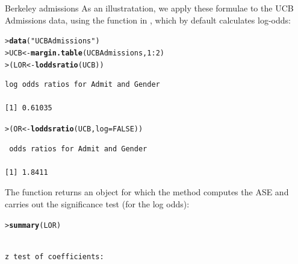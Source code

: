 \documentclass[10pt,krantz2]{krantz}\usepackage[]{graphicx}\usepackage[]{color}
\makeatletter
\newcommand{\hlnum}[1]{\textcolor[rgb]{0.686,0.059,0.569}{#1}}%
\newcommand{\hlstr}[1]{\textcolor[rgb]{0.192,0.494,0.8}{#1}}%
\newcommand{\hlopt}[1]{\textcolor[rgb]{0,0,0}{#1}}%
\newcommand{\hlstd}[1]{\textcolor[rgb]{0.345,0.345,0.345}{#1}}%
\newcommand{\hlkwb}[1]{\textcolor[rgb]{0.69,0.353,0.396}{#1}}%
\newcommand{\hlkwc}[1]{\textcolor[rgb]{0.333,0.667,0.333}{#1}}%
\newcommand{\hlkwd}[1]{\textcolor[rgb]{0.737,0.353,0.396}{\textbf{#1}}}%
\newenvironment{kframe}{%
 \def\at@end@of@kframe{}%
 \ifinner\ifhmode%
  \def\at@end@of@kframe{\end{minipage}}%
  \begin{minipage}{\columnwidth}%
 \fi\fi%
 \def\FrameCommand##1{\hskip\@totalleftmargin \hskip-\fboxsep
 \colorbox{shadecolor}{##1}\hskip-\fboxsep
     \hskip-\linewidth \hskip-\@totalleftmargin \hskip\columnwidth}%
 \MakeFramed {\advance\hsize-\width
   \@totalleftmargin\z@ \linewidth\hsize
   \@setminipage}}%
 {\par\unskip\endMakeFramed%
 \at@end@of@kframe}
\newenvironment{knitrout}{}{} %
\renewenvironment{knitrout}{\small\renewcommand{\baselinestretch}{.85}}{} %
\makeatother
\begin{document}
\begin{Example}[ucbadmissions]{Berkeley admissions}
As an illustratation, we apply these formulae to the UCB Admissions
data, using the  function in , which by
default calculates log-odds:
\begin{knitrout}
\color{fgcolor}\begin{kframe}
\begin{alltt}
\hlstd{> }\hlkwd{data}\hlstd{(}\hlstr{"UCBAdmissions"}\hlstd{)}
\hlstd{> }\hlstd{UCB} \hlkwb{<-} \hlkwd{margin.table}\hlstd{(UCBAdmissions,} \hlnum{1}\hlopt{:}\hlnum{2}\hlstd{)}
\hlstd{> }\hlstd{(LOR} \hlkwb{<-} \hlkwd{loddsratio}\hlstd{(UCB))}
\end{alltt}
\begin{verbatim}
log odds ratios for Admit and Gender 

[1] 0.61035
\end{verbatim}
\begin{alltt}
\hlstd{> }\hlstd{(OR} \hlkwb{<-} \hlkwd{loddsratio}\hlstd{(UCB,} \hlkwc{log} \hlstd{=} \hlnum{FALSE}\hlstd{))}
\end{alltt}
\begin{verbatim}
 odds ratios for Admit and Gender 

[1] 1.8411
\end{verbatim}
\end{kframe}
\end{knitrout}
\noindent The function returns an object for which the 
method computes the ASE and carries out the significance test (for the
log odds):
\begin{knitrout}
\color{fgcolor}\begin{kframe}
\begin{alltt}
\hlstd{> }\hlkwd{summary}\hlstd{(LOR)}
\end{alltt}
\begin{verbatim}

z test of coefficients:


\end{verbatim}
\end{kframe}
\end{knitrout}
\end{Example}
\end{document}
